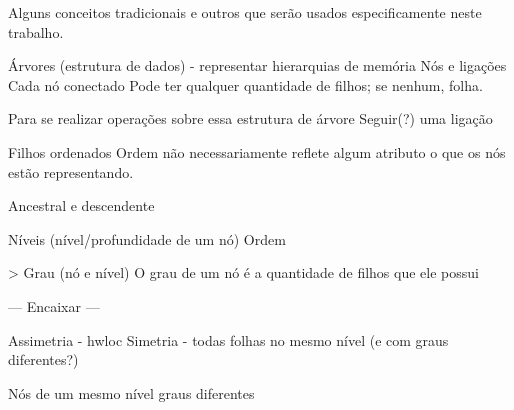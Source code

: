 

Alguns conceitos tradicionais e outros que serão usados especificamente neste trabalho.

Árvores (estrutura de dados) - representar hierarquias de memória
Nós e ligações
Cada nó conectado 
Pode ter qualquer quantidade de filhos; se nenhum, folha.

Para se realizar operações sobre essa estrutura de árvore
Seguir(?) uma ligação

Filhos ordenados
Ordem não necessariamente reflete algum atributo  o que os nós estão representando.

Ancestral e descendente

Níveis (nível/profundidade de um nó)
Ordem

> Grau (nó e nível)
O grau de um nó é a quantidade de filhos que ele possui



--- Encaixar ---

Assimetria - hwloc
Simetria - todas folhas no mesmo nível (e com graus diferentes?)

Nós de um mesmo nível  graus diferentes